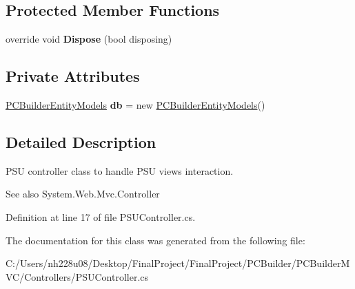 \subsection*{Protected Member Functions}
\begin{DoxyCompactItemize}
\item 
override void {\bfseries Dispose} (bool disposing)\hypertarget{class_p_c_builder_m_v_c_1_1_controllers_1_1_p_s_u_controller_a6c6ac75cfb1d74033266cdb58f28053b}{}\label{class_p_c_builder_m_v_c_1_1_controllers_1_1_p_s_u_controller_a6c6ac75cfb1d74033266cdb58f28053b}

\end{DoxyCompactItemize}
\subsection*{Private Attributes}
\begin{DoxyCompactItemize}
\item 
\hyperlink{class_p_c_builder_m_v_c_1_1_models_1_1_p_c_builder_entity_models}{P\+C\+Builder\+Entity\+Models} {\bfseries db} = new \hyperlink{class_p_c_builder_m_v_c_1_1_models_1_1_p_c_builder_entity_models}{P\+C\+Builder\+Entity\+Models}()\hypertarget{class_p_c_builder_m_v_c_1_1_controllers_1_1_p_s_u_controller_aab5ac6d5e0f7842d4b6c6a05e8ffc692}{}\label{class_p_c_builder_m_v_c_1_1_controllers_1_1_p_s_u_controller_aab5ac6d5e0f7842d4b6c6a05e8ffc692}

\end{DoxyCompactItemize}


\subsection{Detailed Description}
P\+SU controller class to handle P\+SU views interaction. 

\begin{DoxySeeAlso}{See also}
System.\+Web.\+Mvc.\+Controller


\end{DoxySeeAlso}


Definition at line 17 of file P\+S\+U\+Controller.\+cs.



The documentation for this class was generated from the following file\+:\begin{DoxyCompactItemize}
\item 
C\+:/\+Users/nh228u08/\+Desktop/\+Final\+Project/\+Final\+Project/\+P\+C\+Builder/\+P\+C\+Builder\+M\+V\+C/\+Controllers/P\+S\+U\+Controller.\+cs\end{DoxyCompactItemize}
